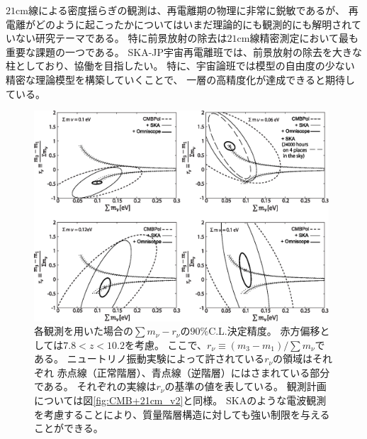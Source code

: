 \begin{enumerate}
$21$cm線による密度揺らぎの観測は、再電離期の物理に非常に鋭敏であるが、
再電離がどのように起こったかについてはいまだ理論的にも観測的にも解明されていない研究テーマである。
特に前景放射の除去は$21$cm線精密測定において最も重要な課題の一つである。
SKA-JP宇宙再電離班では、前景放射の除去を大きな柱としており、協働を目指したい。
特に、宇宙論班では模型の自由度の少ない精密な理論模型を構築していくことで、
一層の高精度化が達成できると期待している。

\vspace{0.2in}

\begin{figure}
\begin{center}
\includegraphics[width=110mm,clip]{cosmology/hierarchy_ellipse_v3.eps}
\caption{
各観測を用いた場合の$\sum m_\nu -r_\nu$の$90\%$C.L.決定精度。
赤方偏移としては$7.8<z<10.2$を考慮。
ここで、$r_\nu\equiv (m_3-m_1)/\sum m_\nu$である。
ニュートリノ振動実験によって許されている$r_\nu$の領域はそれぞれ
赤点線（正常階層）、青点線（逆階層）にはさまれている部分である。
それぞれの実線は$r_\nu$の基準の値を表している。
観測計画については図\ref{fig:CMB+21cm_v2}と同様。
SKAのような電波観測を考慮することにより、質量階層構造に対しても強い制限を与えることができる。
}
\label{fig:hierarchy_ellipse_v3}
\end{center}
\end{figure}



\end{enumerate}
